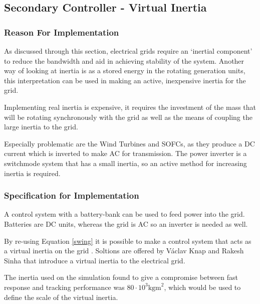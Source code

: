 \subsection{Secondary Controller - Virtual Inertia}
\label{sec:vi}

\subsubsection{Reason For Implementation}

As discussed through this section, electrical grids require an `inertial component' to reduce the bandwidth and aid in achieving stability of the system.
Another way of looking at inertia is as a stored energy in the rotating generation units, this interpretation can be used in making an active, inexpensive inertia for the grid.

Implementing real inertia is expensive, it requires the investment of the mass that will be rotating synchronously with the grid as well as the means of coupling the large inertia to the grid.

Especially problematic are the Wind Turbines and SOFCs, as they produce a DC current which is inverted to make AC for transmission.
The power inverter is a switchmode system that has a small inertia, so an active method for increasing inertia is required.

\subsubsection{Specification for Implementation}

A control system with a battery-bank can be used to feed power into the grid.
Batteries are DC units, whereas the grid is AC so an inverter is needed as well.

By re-using Equation \ref{swing} it is possible to make a control system that acts as a virtual inertia on the grid \cite{power:inertia}.
Soltions are offered by Václav Knap and Rakesh Sinha \cite{power:inertia} that introduce a virtual inertia to the electrical grid. 

The inertia used on the simulation found to give a compromise between fast response and tracking performance was $80 \cdot 10^3\text{kgm}^2$, which would be used to define the scale of the virtual inertia.
